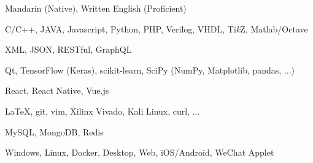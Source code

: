 
\begin{cvtbl}
        {Mandarin (Native), Written English (Proficient)}%

        {C/C++, JAVA, Javascript, Python, PHP, Verilog, VHDL, Ti\textit{k}Z, Matlab/Octave}

        {XML, JSON, RESTful, GraphQL}

        {Qt, TensorFlow (Keras), scikit-learn, SciPy (NumPy, Matplotlib, pandas, ...)}

        {React, React Native, Vue.js}

        {\LaTeX, git, vim, Xilinx Vivado, Kali Linux, curl, ...}

        {MySQL, MongoDB, Redis}

        {Windows, Linux, Docker, Desktop, Web, iOS/Android, WeChat Applet}
\end{cvtbl}

\endinput